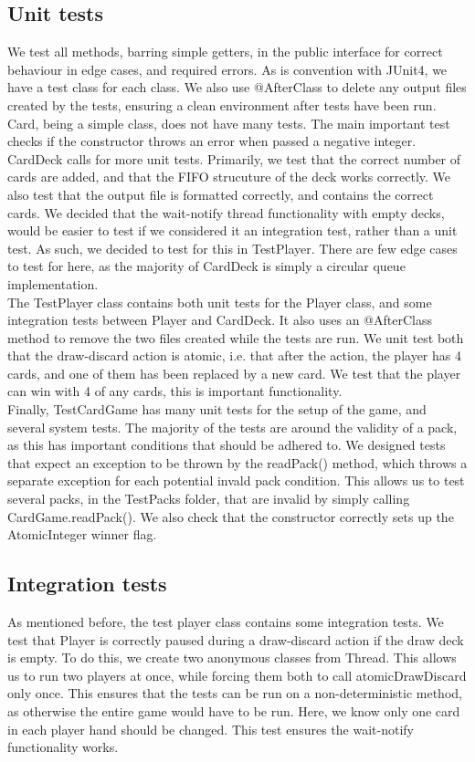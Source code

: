 \documentclass[11p]{article}
\begin{document}
\subsection{Unit tests}
We test all methods, barring simple getters, in the public interface for correct behaviour in edge cases, and required errors. As is convention with JUnit4, we have a test class for each class. We also use @AfterClass to delete any output files created by the tests, ensuring a clean environment after tests have been run. \\
Card, being a simple class, does not have many tests. The main important test checks if the constructor throws an error when passed a negative integer.\\
CardDeck calls for more unit tests. Primarily, we test that the correct number of cards are added, and that the FIFO strucuture of the deck works correctly. We also test that the output file is formatted correctly, and contains the correct cards. We decided that the wait-notify thread functionality with empty decks, would be easier to test if we considered it an integration test, rather than a unit test. As such, we decided to test for this in TestPlayer. There are few edge cases to test for here, as the majority of CardDeck is simply a circular queue implementation.\\
The TestPlayer class contains both unit tests for the Player class, and some integration tests between Player and CardDeck. It also uses an @AfterClass method to remove the two files created while the tests are run. We unit test both that the draw-discard action is atomic, i.e. that after the action, the player has 4 cards, and one of them has been replaced by a new card. We test that the player can win with 4 of any cards, this is important functionality.\\
Finally, TestCardGame has many unit tests for the setup of the game, and several system tests. The majority of the tests are around the validity of a pack, as this has important conditions that should be adhered to. We designed tests that expect an exception to be thrown by the readPack() method, which throws a separate exception for each potential invald pack condition. This allows us to test several packs, in the TestPacks folder, that are invalid by simply calling CardGame.readPack(). We also check that the constructor correctly sets up the AtomicInteger winner flag. \\

\subsection{Integration tests}
As mentioned before, the test player class contains some integration tests. We test that Player is correctly paused during a draw-discard action if the draw deck is empty. To do this, we create two anonymous classes from Thread. This allows us to run two players at once, while forcing them both to call atomicDrawDiscard only once. This ensures that the tests can be run on a non-deterministic method, as otherwise the entire game would have to be run. Here, we know only one card in each player hand should be changed. This test ensures the wait-notify functionality works.
\end{document}
